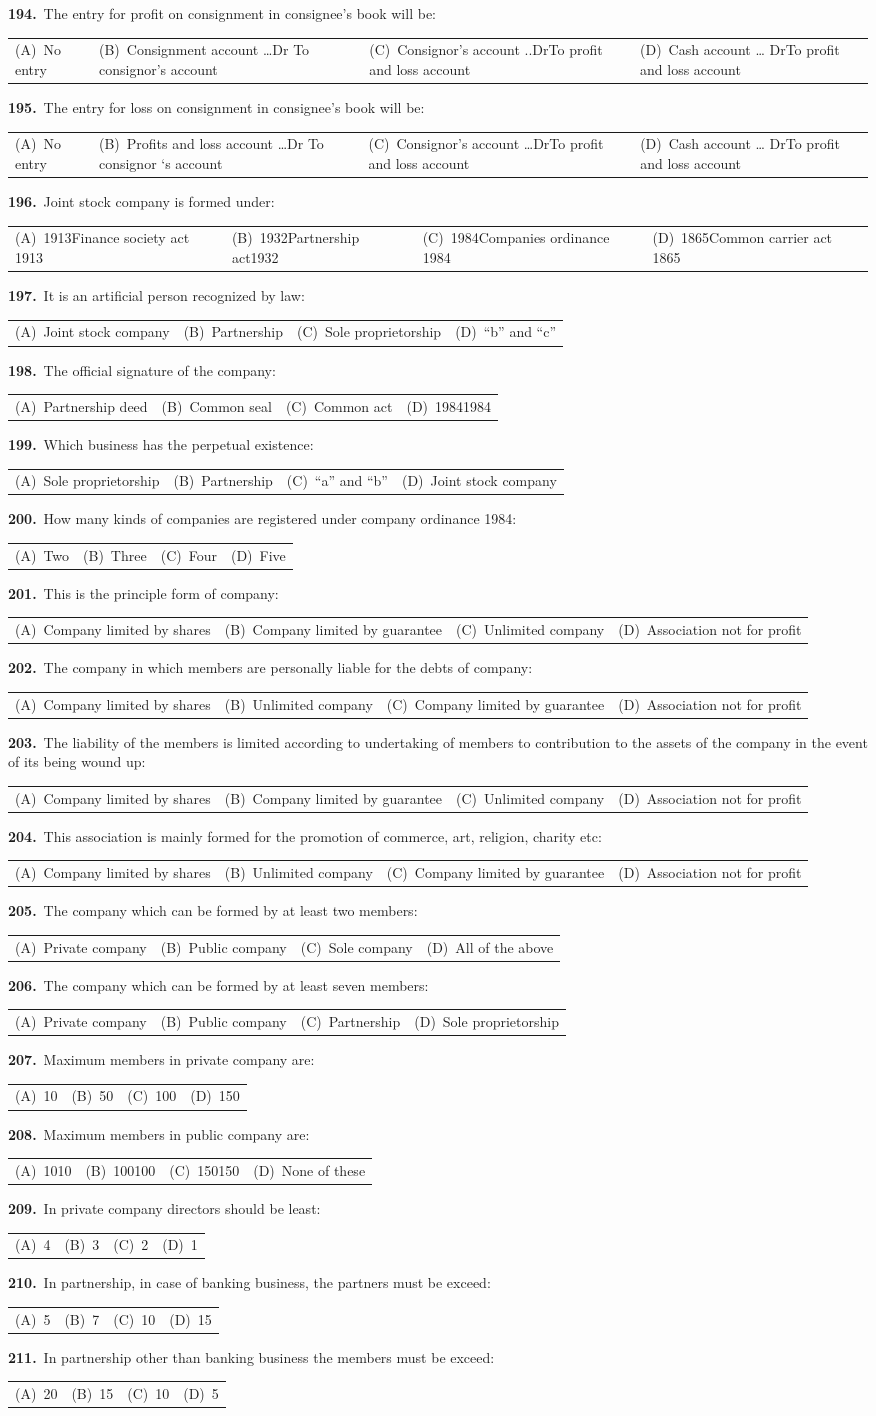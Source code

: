 \documentclass[11pt,a4paper]{article}
\makeatletter
\newcommand{\mcq}[6]{%
  \Needspace{4\baselineskip}%
  \par\medskip\noindent\textbf{#1.}\ #2\par\nopagebreak
  \noindent\begin{tabularx}{\linewidth}{@{\hspace{1.5em}}*{4}{>{\raggedright\arraybackslash}X}@{}}
    (A)~#3 & (B)~#4 & (C)~#5 & (D)~#6
  \end{tabularx}\par}
\makeatother
\begin{document}
\mcq{194}{The entry for profit on consignment in consignee’s book will be:}{No entry}{Consignment account …Dr To consignor’s account}{Consignor’s account ..DrTo profit and loss account}{Cash account … DrTo profit and loss account}
\mcq{195}{The entry for loss on consignment in consignee’s book will be:}{No entry}{Profits and loss account …Dr To consignor ‘s account}{Consignor’s account …DrTo profit and loss account}{Cash account … DrTo profit and loss account}
\mcq{196}{Joint stock company is formed under:}{1913Finance society act 1913}{1932Partnership act1932}{1984Companies ordinance 1984}{1865Common carrier act 1865}
\mcq{197}{It is an artificial person recognized by law:}{Joint stock company}{Partnership}{Sole proprietorship}{“b” and “c”}
\mcq{198}{The official signature of the company:}{Partnership deed}{Common seal}{Common act}{19841984}
\mcq{199}{Which business has the perpetual existence:}{Sole proprietorship}{Partnership}{“a” and “b”}{Joint stock company}
\mcq{200}{How many kinds of companies are registered under company ordinance 1984:}{Two}{Three}{Four}{Five}
\mcq{201}{This is the principle form of company:}{Company limited by shares}{Company limited by guarantee}{Unlimited company}{Association not for profit}
\mcq{202}{The company in which members are personally liable for the debts of company:}{Company limited by shares}{Unlimited company}{Company limited by guarantee}{Association not for profit}
\mcq{203}{The liability of the members is limited according to undertaking of members to contribution to the assets of the company in the event of its being wound up:}{Company limited by shares}{Company limited by guarantee}{Unlimited company}{Association not for profit}
\mcq{204}{This association is mainly formed for the promotion of commerce, art, religion, charity etc:}{Company limited by shares}{Unlimited company}{Company limited by guarantee}{Association not for profit}
\mcq{205}{The company which can be formed by at least two members:}{Private company}{Public company}{Sole company}{All of the above}
\mcq{206}{The company which can be formed by at least seven members:}{Private company}{Public company}{Partnership}{Sole proprietorship}
\mcq{207}{Maximum members in private company are:}{10}{50}{100}{150}
\mcq{208}{Maximum members in public company are:}{1010}{100100}{150150}{None of these}
\mcq{209}{In private company directors should be least:}{4}{3}{2}{1}
\mcq{210}{In partnership, in case of banking business, the partners must be exceed:}{5}{7}{10}{15}
\mcq{211}{In partnership other than banking business the members must be exceed:}{20}{15}{10}{5}
\end{document}

